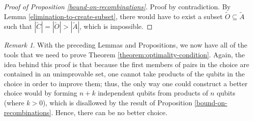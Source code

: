 \documentclass{amsbook}
\theoremstyle{plain}
\theoremstyle{definition}
\theoremstyle{remark}
\newtheorem{remark}{Remark}
\newcommand{\set}{\tilde}
\begin{document}
\begin{proof}[Proof of Proposition \ref{bound-on-recombinations}]
Proof by contradiction.  By Lemma \ref{elimination-to-create-subset}, there would have to exist a subset $\set O\subseteq\set A$ such that $|\set C|=|\set O|>|\set A|$, which is impossible.
\end{proof}
\begin{remark}
With the preceding Lemmas and Propositions, we now have all of the tools that we need to prove Theorem \ref{theorem:optimality-condition}.  Again, the idea behind this proof is that because the first members of pairs in the choice are contained in an unimprovable set, one cannot take products of the qubits in the choice in order to improve them;  thus, the only way one could construct a better choice would by forming $n+k$ independent qubits from products of $n$ qubits (where $k>0$), which is disallowed by the result of Proposition \ref{bound-on-recombinations}.  Hence, there can be no better choice.
\end{remark}
\end{document}
